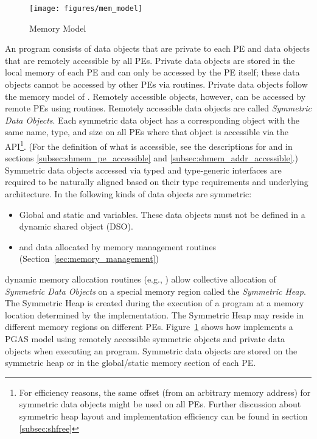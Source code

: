 \begin{figure}[h]
\texttt{[image: figures/mem\_model]}
\caption{\openshmem Memory Model}
\label{fig:mem_model}
\end{figure}
%
An \openshmem program consists of data objects that are private to each \ac{PE}
and data  objects that are remotely accessible by all \acp{PE}. Private data
objects are stored in the local memory of each \ac{PE} and can only be accessed
by the \ac{PE} itself; these data objects cannot be accessed by other \acp{PE}
via \openshmem routines. Private data objects follow the memory model of
\Cstd. Remotely accessible objects, however, can be accessed by
remote \acp{PE} using \openshmem routines.  Remotely accessible data objects are
called \emph{Symmetric Data Objects}.  Each symmetric data object has a
corresponding object with the same name, type, and size on all \acp{PE} where that object is
accessible via the \openshmem \ac{API}\footnote{For efficiency reasons,
the same offset (from an arbitrary memory address) for symmetric data
objects might be used on all \acp{PE}. Further discussion about symmetric heap
layout and implementation efficiency can be found in section
\ref{subsec:shfree}}.  (For the definition of what is accessible, see the
descriptions for  and 
in sections \ref{subsec:shmem_pe_accessible} and
\ref{subsec:shmem_addr_accessible}.) Symmetric data objects accessed via typed and
type-generic \openshmem interfaces are required to be naturally aligned based on their type
requirements and underlying architecture.  In \openshmem the following kinds of
data objects are symmetric:
%
\begin{itemize}
\item Global and static \Cstd and \Cpp variables. These data objects must
  not be defined in a dynamic shared object (DSO).
\item \Cstd and \Cpp data allocated by \openshmem memory management routines
  (Section~\ref{sec:memory_management})
\end{itemize}

\openshmem dynamic memory allocation routines (e.g.,
) allow collective allocation of \emph{Symmetric Data
Objects} on a special memory region called the \emph{Symmetric Heap}. The
Symmetric Heap is created during the execution of a program at a memory location
determined by the implementation. The Symmetric Heap may reside in different
memory regions on different \acp{PE}. Figure~\ref{fig:mem_model} shows how
\openshmem implements a \ac{PGAS} model using remotely accessible symmetric
objects and private data objects when executing an \openshmem program.
Symmetric data objects are stored on the symmetric heap or in the global/static
memory section of each \ac{PE}.

